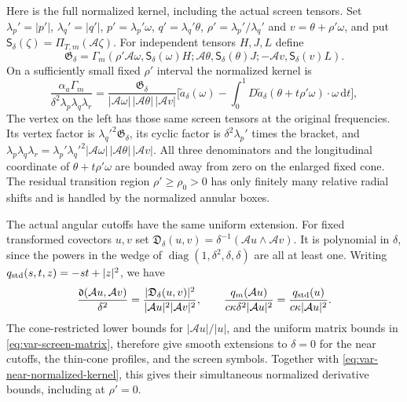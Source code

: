 \documentclass[11pt,a4paper]{article}
\numberwithin{equation}{section}
\newcommand{\dd}{\mathrm d}
\newcommand{\f}[2]{\frac{#1}{#2}}
\theoremstyle{definition}
\begin{document}
Here is the full normalized kernel, including the actual screen tensors.
Set $\lambda_p'=|p'|$, $\lambda_q'=|q'|$,
$p'=\lambda_p'\omega$, $q'=\lambda_q'\theta$, $\rho'=\lambda_p'/\lambda_q'$ and
$v=\theta+\rho'\omega$, and put
$\mathsf S_\delta(\zeta)=\Pi_{T,m}(\mathcal A\zeta)$. For independent
tensors $H,J,L$ define
\begin{equation*}
\mathfrak G_\delta=
\Gamma_m(\rho'\mathcal A\omega,\mathsf S_\delta(\omega)H;
         \mathcal A\theta,\mathsf S_\delta(\theta)J;
         -\mathcal A v,\mathsf S_\delta(v)L).
\end{equation*}
On a sufficiently small fixed $\rho'$ interval the normalized kernel is
\begin{equation}\label{eq:var-near-normalized-kernel}
\f{\alpha_a\Gamma_m}{\delta^2\lambda_p\lambda_q\lambda_r}
=\f{\mathfrak G_\delta}
 {|\mathcal A\omega|\,|\mathcal A\theta|\,|\mathcal A v|}
 \bigg[\widetilde a_\delta(\omega)
 -\int_0^1 D\widetilde a_\delta(\theta+t\rho'\omega)
                         \cdot\omega\,\dd t\bigg],
\end{equation}
The vertex on the left has those same screen tensors
at the original frequencies. Its vertex factor is
$\lambda_q'^2\mathfrak G_\delta$, its cyclic factor is $\delta^2\lambda_p'$ times
the bracket, and $\lambda_p\lambda_q\lambda_r=\lambda_p'\lambda_q'^2|\mathcal A\omega|\,
|\mathcal A\theta|\,|\mathcal A v|$. All three denominators and
the longitudinal coordinate of $\theta+t\rho'\omega$ are bounded
away from zero on the enlarged fixed cone. The residual transition
region $\rho'\geq\rho_0>0$ has only finitely many relative radial
shifts and is handled by the normalized annular boxes.

The actual angular cutoffs have the same uniform extension.
For fixed transformed covectors $u,v$ set
$\mathfrak D_\delta(u,v)=\delta^{-1}(\mathcal A u\wedge\mathcal A v)$.
It is polynomial in $\delta$, since the powers in the wedge of
$\operatorname{diag}(1,\delta^2,\delta,\delta)$ are all at least one.
Writing $q_{\rm std}(s,t,z)=-st+|z|^2$, we have
\begin{equation*}
\f{\mathfrak d(\mathcal A u,\mathcal A v)}{\delta^2}
=\f{|\mathfrak D_\delta(u,v)|^2}
 {|\mathcal A u|^2|\mathcal A v|^2},\qquad
\f{q_m(\mathcal A u)}{c\kappa\delta^2|\mathcal A u|^2}
=\f{q_{\rm std}(u)}{c\kappa|\mathcal A u|^2}.
\end{equation*}
The cone-restricted lower bounds for $|\mathcal A u|/|u|$, and the
uniform matrix bounds in \eqref{eq:var-screen-matrix}, therefore give
smooth extensions to $\delta=0$ for the near cutoffs, the thin-cone
profiles, and the screen symbols. Together with
\eqref{eq:var-near-normalized-kernel}, this gives their simultaneous
normalized derivative bounds, including at $\rho'=0$.
\end{document}
